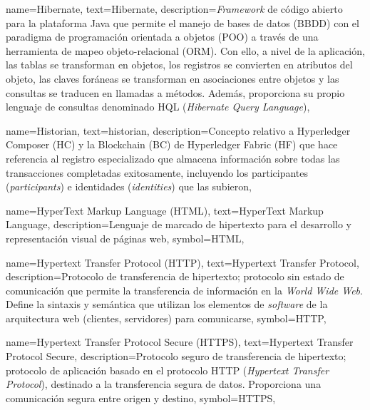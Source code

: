 {
    name={Hibernate},
    text={Hibernate},
    description={\textit{Framework} de código abierto para la plataforma Java que permite el manejo de bases de datos (BBDD) con el paradigma de programación orientada a objetos (POO) a través de una herramienta de mapeo objeto-relacional (ORM). Con ello, a nivel de la aplicación, las tablas se transforman en objetos, los registros se convierten en atributos del objeto, las claves foráneas se transforman en asociaciones entre objetos y las consultas se traducen en llamadas a métodos. Además, proporciona su propio lenguaje de consultas denominado HQL (\textit{Hibernate Query Language})},
}

{
    name={Historian},
    text={historian},
    description={Concepto relativo a Hyperledger Composer (HC) y la Blockchain (BC) de Hyperledger Fabric (HF) que hace referencia al registro especializado que almacena información sobre todas las transacciones completadas exitosamente, incluyendo los participantes (\textit{participants}) e identidades (\textit{identities}) que las subieron},
}

{
    name={HyperText Markup Language (HTML)},
    text={HyperText Markup Language},
    description={Lenguaje de marcado de hipertexto para el desarrollo y representación visual de páginas web},
    symbol={HTML},
}
		
{
    name={Hypertext Transfer Protocol (HTTP)},
    text={Hypertext Transfer Protocol},
    description={Protocolo de transferencia de hipertexto; protocolo sin estado de comunicación que permite la transferencia de información en la \textit{World Wide Web}. Define la sintaxis y semántica que utilizan los elementos de \textit{software} de la arquitectura web (clientes, servidores) para comunicarse},
    symbol={HTTP},
}
			
{
    name={Hypertext Transfer Protocol Secure (HTTPS)},
    text={Hypertext Transfer Protocol Secure},
    description={Protocolo seguro de transferencia de hipertexto; protocolo de aplicación basado en el protocolo HTTP (\textit{Hypertext Transfer Protocol}), destinado a la transferencia segura de datos. Proporciona una comunicación segura entre origen y destino},
    symbol={HTTPS},
}
		
